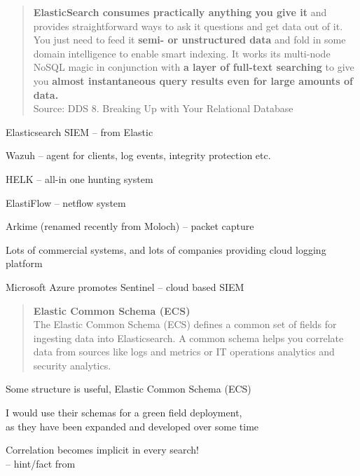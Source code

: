 \documentclass[Screen16to9,17pt]{foils}
\begin{document}


\begin{quote}\small
{\bf ElasticSearch consumes practically anything you give it} and provides straightforward ways to ask it questions and get data out of it. You just need to feed it {\bf semi- or unstructured data} and fold in some domain intelligence to enable smart indexing. It works its multi-node NoSQL magic in conjunction with {\bf a layer of full-text searching} to give you {\bf almost instantaneous query results even for large amounts of data.}\\
Source: DDS 8. Breaking Up with Your Relational Database
\end{quote}

\begin{list2}
\item Elasticsearch SIEM -- from Elastic
\item Wazuh -- agent for clients, log events, integrity protection etc.
\item HELK -- all-in one hunting system
\item ElastiFlow -- netflow system
\item Arkime (renamed recently from Moloch) -- packet capture
\end{list2}

Lots of commercial systems, and lots of companies providing cloud logging platform

Microsoft Azure promotes Sentinel -- cloud based SIEM\\ {\footnotesize
{}}




\begin{quote}{\bf
Elastic Common Schema (ECS)}\\
The Elastic Common Schema (ECS) defines a common set of fields for ingesting data into Elasticsearch. A common schema helps you correlate data from sources like logs and metrics or IT operations analytics and security analytics.
\end{quote}

\begin{list2}

\item Some structure is useful, Elastic Common Schema (ECS)\\
\item I would use their schemas for a green field deployment,\\
  as they have been expanded and developed over some time
\item Correlation becomes implicit in every search!\\
-- hint/fact from {\small{}}
\end{list2}
\end{document}
